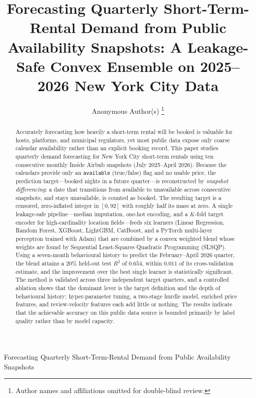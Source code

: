 \documentclass[journal]{IEEEtran}
\begin{document}
\title{Forecasting Quarterly Short-Term-Rental Demand from Public Availability
Snapshots: A Leakage-Safe Convex Ensemble on 2025--2026 New York City Data}

\author{Anonymous Author(s)%
\thanks{Author names and affiliations omitted for double-blind review.}}

%
{Forecasting Quarterly Short-Term-Rental Demand from Public Availability Snapshots}
\maketitle

\begin{abstract}
Accurately forecasting how heavily a short-term rental will be booked is valuable
for hosts, platforms, and municipal regulators, yet most public data expose only
coarse calendar availability rather than an explicit booking record. This paper
studies quarterly demand forecasting for New York City short-term rentals using
ten consecutive monthly Inside Airbnb snapshots (July 2025--April 2026). Because
the calendars provide only an \texttt{available} (true/false) flag and no usable
price, the prediction target---booked nights in a future quarter---is reconstructed
by \emph{snapshot differencing}: a date that transitions from available to
unavailable across consecutive snapshots, and stays unavailable, is counted as
booked. The resulting target is a censored, zero-inflated integer in $[0,92]$ with
roughly half its mass at zero. A single leakage-safe pipeline---median imputation,
one-hot encoding, and a $K$-fold target encoder for high-cardinality location
fields---feeds six learners (Linear Regression, Random Forest, XGBoost, LightGBM,
CatBoost, and a PyTorch multi-layer perceptron trained with Adam) that are combined
by a convex weighted blend whose weights are found by
Sequential Least-Squares Quadratic Programming (SLSQP). Using a seven-month
behavioural history to predict the February--April 2026 quarter, the blend attains
a $20\%$ held-out test $R^2$ of $0.654$, within $0.011$ of its cross-validation
estimate, and the improvement over the best single learner is statistically
significant. The method is validated across three independent target quarters,
and a controlled ablation shows that the dominant lever is the target definition
and the depth of behavioural history; hyper-parameter tuning, a two-stage hurdle
model, enriched price features, and review-velocity features each add little or
nothing. The results indicate that the achievable accuracy on this public data
source is bounded primarily by label quality rather than by model capacity.
\end{abstract}
\end{document}
